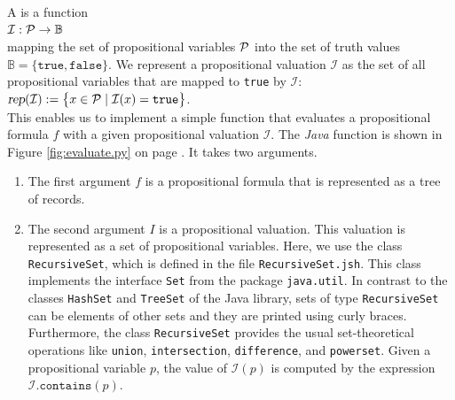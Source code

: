 A  is a function  
\\[0.2cm]
\hspace*{1.3cm} ${\cal I}: {\cal P} \rightarrow \mathbb{B}$ \\[0.2cm]
mapping the set of propositional variables ${\cal P}$ into the set of truth values
$\mathbb{B} = \bigl\{ \mathtt{true}, \mathtt{false} \bigr\}$.
We represent a propositional valuation $\mathcal{I}$ as the set of all propositional variables that are mapped
to \texttt{true} by $\mathcal{I}$:
\\[0.2cm]
\hspace*{1.3cm}
$\textsl{rep}(\mathcal{I}) := \bigl\{ x \in \mathcal{P} \mid \mathcal{I}(x) = \texttt{true} \bigr\}$.
\\[0.2cm]
This enables us to implement a simple function that evaluates a propositional formula $f$ with a given
propositional valuation $\mathcal{I}$.
The \textsl{Java} function  is shown in Figure \ref{fig:evaluate.py} on page
\pageref{fig:evaluate.py}.  It takes two arguments.
\begin{enumerate}
\item The first argument $f$ is a propositional formula that is represented as a tree of records.
\item The second argument $I$ is a propositional valuation.  This valuation is represented as a set of
      propositional variables. Here, we use the class \texttt{RecursiveSet}, which is defined in the file
      \texttt{RecursiveSet.jsh}.  This class implements the interface \texttt{Set} from the package
      \texttt{java.util}.  In contrast to the classes \texttt{HashSet} and \texttt{TreeSet} of the
      Java library, sets of type \texttt{RecursiveSet} can be elements of other sets and they are printed using
      curly braces.  Furthermore, the class \texttt{RecursiveSet} provides the usual set-theoretical
      operations like \texttt{union}, \texttt{intersection}, \texttt{difference}, and \texttt{powerset}.
      Given a propositional variable $p$, the value of $\mathcal{I}(p)$ is computed
      by the expression  $\mathcal{I}\mathtt{.contains}(p)$.
\end{enumerate}


